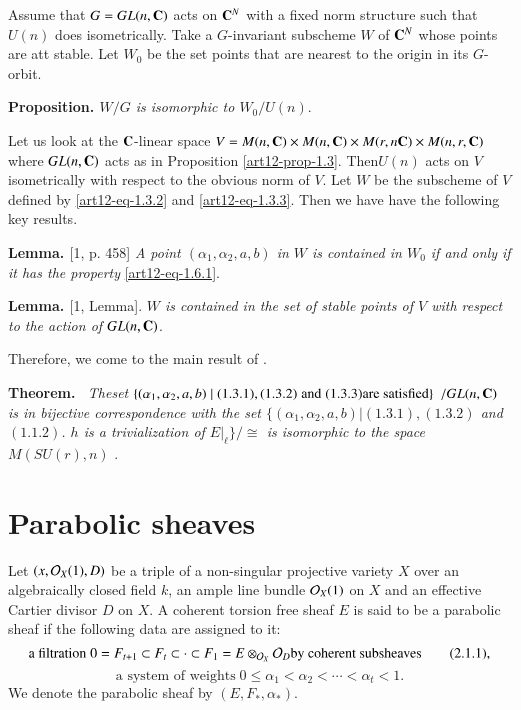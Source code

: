 Assume that $G=GL(n,\mathbf{C})$ acts on $\mathbf{C}^{N}$ with a fixed norm structure such that $U(n)$ does isometrically. Take a $G$-invariant subscheme $W$ of $\mathbf{C}^{N}$ whose points are att stable. Let $W_{0}$ be the set points that are nearest to the origin in its $G$-orbit.

\medskip
\noindent
{\bfseries {} Proposition. \label{art12-prop-1.7}} \textit{$W/G$ is isomorphic to $W_{0}/U(n)$}.

Let us look at the $\mathbf{C}$-linear space $V=M(n,\mathbf{C}) \times M(n,\mathbf{C}) \times M(r,n \mathbf{C})\times M(n,r,\mathbf{C})$ where $GL(n,\mathbf{C})$ acts as in Proposition \ref{art12-prop-1.3}. Then$U(n)$ acts on $V$ isometrically with respect to the obvious norm of $V$. Let $W$ be the subscheme of $V$ defined by \eqref{art12-eq-1.3.2} and \eqref{art12-eq-1.3.3}. Then we have have the following key results. 

\medskip
\noindent
{\bfseries {} Lemma. \label{art12-Lemma-1.8}} [1, p. 458] \textit{A point $(\alpha_{1}, \alpha_{2}, a, b)$ in $W$ is contained in $W_{0}$ if and only if it has the property} \eqref{art12-eq-1.6.1}.

\medskip
\noindent
{\bfseries {} Lemma. \label{art12-Lemma-1.9}} [1, Lemma]. \textit{$W$ is contained in the set of stable points of $V$ with respect to the action of $GL(n,\mathbf{C})$}.

Therefore, we come to the main result of \cite{art12-key1}.

\medskip
\noindent
{\bfseries {} Theorem. \label{art12-Thm-1.10}}~\textit{The\pageoriginale set $\{(\alpha_{1}, \alpha_{2}, a, b)\; | \;(1.3.1), (1.3.2)\; \text{and} \;(1.3.3)\break \text{are satisfied} \}$ $/GL(n,\mathbf{C})$ is in bijective correspondence with the set \break $\{(\alpha_{1}, \alpha_{2}, a, b) | (1.3.1), (1.3.2)$ {\rm and} $(1.1.2)$. $h$ {\rm is a trivialization of} $E|_{\ell}\}/\cong$  is isomorphic to the space $M(SU(r),n)$ }.

\section{Parabolic sheaves}\label{art12-sec-2}
Let $(x, \mathcal{O}_{X}(1), D)$ be a triple of a non-singular projective variety $X$ over an algebraically closed field $k$, an ample line bundle $\mathcal{O}_{X}(1)$ on $X$ and an effective  Cartier divisor $D$ on $X$. A coherent torsion free sheaf $E$ is said to be a parabolic sheaf if the following data are assigned to it:
\begin{equation}
\text{a filtration}\; 0 = F_{t+1} \subset F_{t} \subset \cdot \subset F_{1} = E \otimes_{\mathcal{O}_{X}}\mathcal{O}_{D}
\text{by coherent subsheaves}\tag{2.1.1}\label{art12-eq-2.1.1},
\end{equation}
\begin{equation}
\text{a system of weights} \; 0 \leq \alpha_{1} < \alpha_{2} < \cdots < \alpha_{t} < 1.\tag{2.1.2}\label{art12-eq-2.1.2}
\end{equation}
We denote the parabolic sheaf by $(E, F_{*}, \alpha_{*})$.

